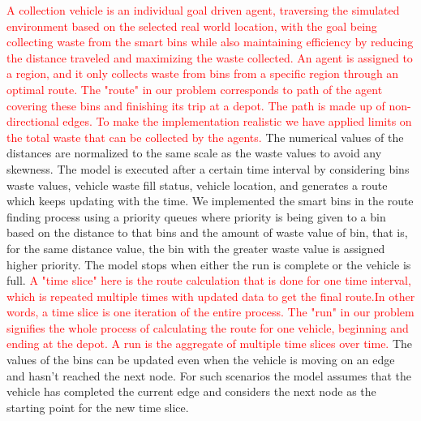 \documentclass[12pt]{article}
\begin{document}
\textcolor{red}{A collection vehicle is an individual goal driven agent, traversing the simulated environment based on the selected real world location, with the goal being collecting waste from the smart bins while also maintaining efficiency by reducing the distance traveled and maximizing the waste collected. An agent is assigned to a region, and it only collects waste from bins from a specific region through an optimal route.  The "route" in our problem corresponds to path of the agent covering these bins and finishing its trip at a depot. The path is made up of  non-directional edges. To make the implementation realistic we have applied limits on the total waste that can be collected by the agents.} 
The numerical values of the distances are normalized to the same scale as the waste values to avoid any skewness. The model is executed after a certain time interval by considering  bins waste values, vehicle waste fill status, vehicle location, and generates a route which keeps updating with the time. We implemented the smart bins in the route finding process using a priority queues where priority is being given to a bin based on the distance to that bins and the amount of waste value of bin, that is, for the same distance value, the bin with the greater waste value is assigned higher priority. The model stops when either the run is complete or the vehicle is full. \textcolor{red}{A "time slice" here is the route calculation that is done for one time interval, which is repeated multiple times with updated data to get the final route.In other words, a time slice is one iteration of the entire process. The "run" in our problem signifies the whole process of calculating the route for one vehicle, beginning and ending at the depot. A run is the aggregate of multiple time slices over time.} The values of the bins can be updated even when the vehicle is moving on an edge and hasn't reached the next node. For such scenarios the model assumes that the vehicle has completed the current edge and considers the next node as the starting point for the new time slice.
\end{document}
